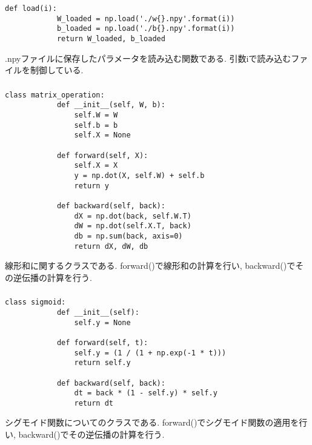 \documentclass[a4j, titlepage]{jarticle}
\begin{document}
    \subsubsection*{}
        \begin{lstlisting}[caption=ファイルに保存したパラメータの読み込み,label=fuga]
        def load(i):
            W_loaded = np.load('./w{}.npy'.format(i))
            b_loaded = np.load('./b{}.npy'.format(i))
            return W_loaded, b_loaded
        \end{lstlisting}
        .npyファイルに保存したパラメータを読み込む関数である.
        引数iで読み込むファイルを制御している.

    \subsubsection*{}
        \begin{lstlisting}[caption=線形和の計算とその逆伝播,label=fuga]
        class matrix_operation:
            def __init__(self, W, b):
                self.W = W
                self.b = b
                self.X = None

            def forward(self, X):
                self.X = X
                y = np.dot(X, self.W) + self.b
                return y

            def backward(self, back):
                dX = np.dot(back, self.W.T)
                dW = np.dot(self.X.T, back)
                db = np.sum(back, axis=0)
                return dX, dW, db
        \end{lstlisting}
        線形和に関するクラスである.
        forward()で線形和の計算を行い, backward()でその逆伝播の計算を行う.

    \subsubsection*{}
        \begin{lstlisting}[caption=シグモイド関数の計算とその逆伝播,label=fuga]
        class sigmoid:
            def __init__(self):
                self.y = None

            def forward(self, t):
                self.y = (1 / (1 + np.exp(-1 * t)))
                return self.y

            def backward(self, back):
                dt = back * (1 - self.y) * self.y
                return dt
        \end{lstlisting}
        シグモイド関数についてのクラスである.
        forward()でシグモイド関数の適用を行い, backward()でその逆伝播の計算を行う.
\end{document}
